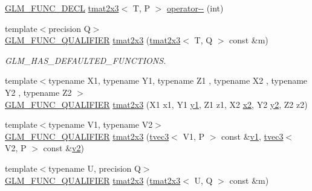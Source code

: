 \begin{DoxyCompactItemize}
\item 
\mbox{\hyperlink{setup_8hpp_ab2d052de21a70539923e9bcbf6e83a51}{G\+L\+M\+\_\+\+F\+U\+N\+C\+\_\+\+D\+E\+CL}} \mbox{\hyperlink{structglm_1_1tmat2x3}{tmat2x3}}$<$ T, P $>$ \mbox{\hyperlink{structglm_1_1tmat2x3_a1bc6bd0e64ef98585c680a9365614f7c}{operator-\/-\/}} (int)
\item 
{\footnotesize template$<$precision Q$>$ }\\\mbox{\hyperlink{setup_8hpp_a33fdea6f91c5f834105f7415e2a64407}{G\+L\+M\+\_\+\+F\+U\+N\+C\+\_\+\+Q\+U\+A\+L\+I\+F\+I\+ER}} \mbox{\hyperlink{structglm_1_1tmat2x3_afb43a1d554a16750b2f42ebe95579a86}{tmat2x3}} (\mbox{\hyperlink{structglm_1_1tmat2x3}{tmat2x3}}$<$ T, Q $>$ const \&m)
\begin{DoxyCompactList}\small\item\em G\+L\+M\+\_\+\+H\+A\+S\+\_\+\+D\+E\+F\+A\+U\+L\+T\+E\+D\+\_\+\+F\+U\+N\+C\+T\+I\+O\+NS. \end{DoxyCompactList}\item 
{\footnotesize template$<$typename X1, typename Y1, typename Z1 , typename X2 , typename Y2 , typename Z2 $>$ }\\\mbox{\hyperlink{setup_8hpp_a33fdea6f91c5f834105f7415e2a64407}{G\+L\+M\+\_\+\+F\+U\+N\+C\+\_\+\+Q\+U\+A\+L\+I\+F\+I\+ER}} \mbox{\hyperlink{structglm_1_1tmat2x3_aafa68618483fa56dce44ee2a8bcb91c0}{tmat2x3}} (X1 x1, Y1 \mbox{\hyperlink{glad_8h_a48340161068d267815ac3131e9d03def}{y1}}, Z1 z1, X2 \mbox{\hyperlink{glad_8h_ad2cea6eadb01f017f0d57e7edf0ce988}{x2}}, Y2 \mbox{\hyperlink{glad_8h_af7158b5d27f7a6aa4ab9973fcc3a5c20}{y2}}, Z2 z2)
\item 
{\footnotesize template$<$typename V1, typename V2$>$ }\\\mbox{\hyperlink{setup_8hpp_a33fdea6f91c5f834105f7415e2a64407}{G\+L\+M\+\_\+\+F\+U\+N\+C\+\_\+\+Q\+U\+A\+L\+I\+F\+I\+ER}} \mbox{\hyperlink{structglm_1_1tmat2x3_a4cb1b9991bfa8f25e56a637081d4ee67}{tmat2x3}} (\mbox{\hyperlink{structglm_1_1tvec3}{tvec3}}$<$ V1, P $>$ const \&\mbox{\hyperlink{glad_8h_a0779c3b73f9aa3a0ac5b0139b5d291d9}{v1}}, \mbox{\hyperlink{structglm_1_1tvec3}{tvec3}}$<$ V2, P $>$ const \&\mbox{\hyperlink{glad_8h_a9a09a1837922b2b806f4589096a52049}{v2}})
\item 
{\footnotesize template$<$typename U, precision Q$>$ }\\\mbox{\hyperlink{setup_8hpp_a33fdea6f91c5f834105f7415e2a64407}{G\+L\+M\+\_\+\+F\+U\+N\+C\+\_\+\+Q\+U\+A\+L\+I\+F\+I\+ER}} \mbox{\hyperlink{structglm_1_1tmat2x3_a9a042a9919399f8eed6946601dbb79da}{tmat2x3}} (\mbox{\hyperlink{structglm_1_1tmat2x3}{tmat2x3}}$<$ U, Q $>$ const \&m)

\end{DoxyCompactItemize}
